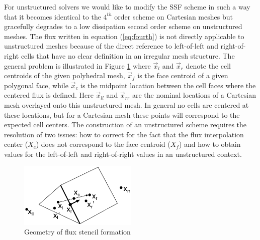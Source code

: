 For unstructured solvers we would like to modify the SSF scheme in
such a way that it becomes identical to the $4^{th}$ order scheme on
Cartesian meshes but gracefully degrades to a low dissipation second
order scheme on unstructured meshes.  The flux written in equation
(\ref{eq:fourth}) is not directly applicable to unstructured meshes
because of the direct reference to left-of-left and right-of-right
cells that have no clear definition in an irregular mesh structure.
The general problem is illustrated in Figure \ref{fig:stencil}
where $\vec{x}_l$ and $\vec{x}_r$ denote the cell centroids of the
given polyhedral mesh, $\vec{x}_f$ is the face centroid of a given
polygonal face, while $\vec{x}_c$ is the midpoint location between
the cell faces where the centered flux is defined.  Here
$\vec{x}_{ll}$ and $\vec{x}_{rr}$ are the nominal locations of a
Cartesian mesh overlayed onto this unstructured mesh.  In general no
cells are centered at these locations, but for a Cartesian mesh these
points will correspond to the expected cell centers.  The construction
of an unstructured scheme requires the resolution of two issues: how
to correct for the fact that the flux interpolation center ($X_c$)
does not correspond to the face centroid ($X_f$) and how to obtain
values for the left-of-left and right-of-right values in an
unstructured context.

\begin{figure}[h]
\begin{center}
\includegraphics[width=0.5\textwidth]{Figures/flux_correct}
\caption{Geometry of flux stencil formation}
\label{fig:stencil}
\end{center}
\end{figure}


